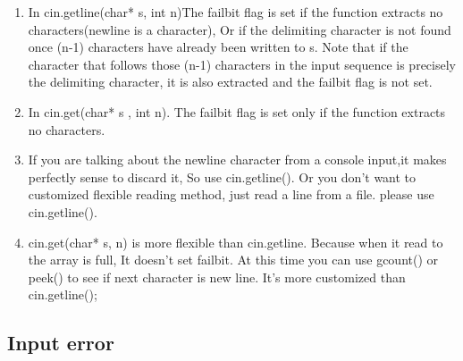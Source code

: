 \documentclass[a4paper,11pt,twoside]{book}
\begin{document}
\begin{itemize}
\begin{enumerate}
		\item In cin.getline(char* s, int n)The failbit flag is set if the function extracts no characters(newline is a character), Or if the delimiting character is not found once (n-1) characters have already been written to s. Note that if the character that follows those (n-1) characters in the input sequence is precisely the delimiting character, it is also extracted and the failbit flag is not set.
		
		\item In cin.get(char* s ,  int n). The failbit flag is set only if the function extracts no characters.
		
		\item If you are talking about the newline character from a console input,it makes perfectly sense to discard it, So use cin.getline(). Or you don't want to customized flexible reading method, just read a line from a file. please use cin.getline().
		
		\item cin.get(char* s, n) is more flexible than cin.getline. Because when it read to the array is full, It doesn't set failbit. At this time you can use gcount() or peek() to see if next character is new line. It's more customized than  cin.getline();
	\end{enumerate}
	
\end{itemize}

\subsection{Input error}
\end{document}
